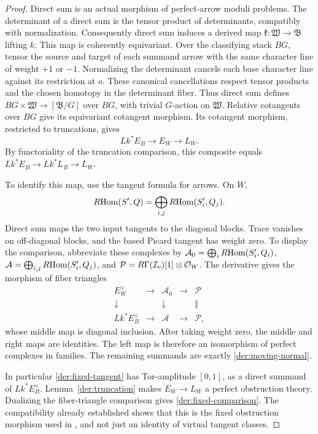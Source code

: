 \begin{proof}
Direct sum is an actual morphism of perfect-arrow moduli problems.
The determinant of a direct sum is the tensor product of determinants,
compatibly with normalization.  Consequently direct sum induces a
derived map $\mathfrak k:\mathfrak W\to\mathfrak B$ lifting $k$.
This map is coherently equivariant.  Over the classifying stack $BG$,
tensor the source and target of each summand arrow with the same
character line of weight $+1$ or $-1$.  Normalizing the determinant
cancels each base character line against its restriction at $o$.
These canonical cancellations respect tensor products and the chosen
homotopy in the determinant fiber.  Thus direct sum defines
$BG\times\mathfrak W\to[\mathfrak B/G]$ over $BG$, with trivial
$G$-action on $\mathfrak W$.  Relative cotangents over $BG$ give its
equivariant cotangent morphism.
Its cotangent morphism, restricted to truncations, gives
\[
Lk^*E_B\longrightarrow E_W\longrightarrow L_W.
\]
By functoriality of the truncation comparison, this composite equals
$Lk^*E_B\to Lk^*L_B\to L_W$.

To identify this map, use the tangent formula for arrows.  On $W$,
\[
R\!\operatorname{Hom}(S',Q)=\bigoplus_{i,j}R\!\operatorname{Hom}(S'_i,Q_j).
\]
Direct sum maps the two input tangents to the diagonal blocks.  Trace
vanishes on off-diagonal blocks, and the based Picard tangent has weight
zero.  To display the comparison, abbreviate these complexes by
$\mathcal A_0=\bigoplus_iR\!\operatorname{Hom}(S'_i,Q_i)$,
$\mathcal A=\bigoplus_{i,j}R\!\operatorname{Hom}(S'_i,Q_j)$, and
$\mathcal P=R\Gamma(\mathcal I_o)[1]\otimes\mathcal O_W$.
The derivative gives the morphism of fiber triangles
\[
\begin{array}{ccccc}
E_W^\vee&\longrightarrow&\mathcal A_0&\longrightarrow&\mathcal P\\
\downarrow&&\downarrow&&\Vert\\
Lk^*E_B^\vee&\longrightarrow&\mathcal A&\longrightarrow&\mathcal P,
\end{array}
\]
whose middle map is diagonal inclusion.  After taking weight zero, the
middle and right maps are identities.  The left map is therefore an
isomorphism of perfect complexes in
families.  The remaining summands are exactly
\eqref{der:moving-normal}.

In particular \eqref{der:fixed-tangent} has Tor-amplitude $[0,1]$,
as a direct summand of $Lk^*E_B^\vee$.  Lemma~\ref{der:truncation}
makes $E_W\to L_W$ a perfect obstruction theory.  Dualizing the
fiber-triangle comparison gives \eqref{der:fixed-comparison}.  The
compatibility already established shows that this is the fixed
obstruction morphism used in \cite[Proposition~1]{GP}, and not just an
identity of virtual tangent classes.
\end{proof}

